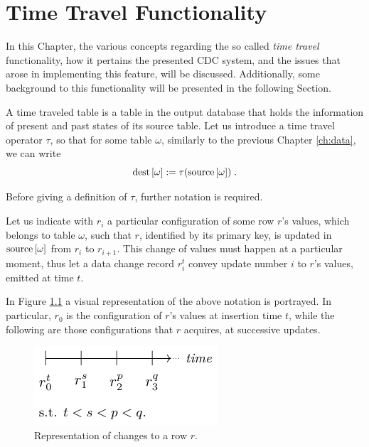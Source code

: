 \chapter{Time Travel Functionality}
\label{ch:timetravel}

%	

In this Chapter, the various concepts regarding the so called \emph{time travel} functionality, how it pertains the presented CDC system, and the issues that arose in implementing this feature, will be discussed.
Additionally, some background to this functionality will be presented in the following Section.

A time traveled table is a table in the output database that holds the information of present and past states of its source table.
Let us introduce a time travel operator $\tau$, so that for some table $\omega$, similarly to the previous Chapter \ref{ch:data}, we can write
$$
\text{dest}\left[{\omega}\right] := \tau(\text{source}\left[{\omega}\right]) \; .
$$

Before giving a definition of $\tau$, further notation is required.

Let us indicate with $r_i$ a particular configuration of some row $r$'s values, which belongs to table $\omega$, such that $r$, identified by its primary key, is updated in $\text{source}\left[{\omega}\right]$ from $r_i$ to $r_{i + 1}$.
This change of values must happen at a particular moment, thus let a data change record $r_i^t$ convey update number $i$ to $r$'s values, emitted at time $t$.

In Figure \ref{fig:tt-intro} a visual representation of the above notation is portrayed.
In particular, $r_0$ is the configuration of $r$'s values at insertion time $t$, while the following are those configurations that $r$ acquires, at successive updates.

\begin{figure}
	\centering
	\includegraphics[width=0.4\linewidth]{figures/time-travel/intro}
	\caption{Representation of changes to a row $r$.}
	\label{fig:tt-intro}
\end{figure}

